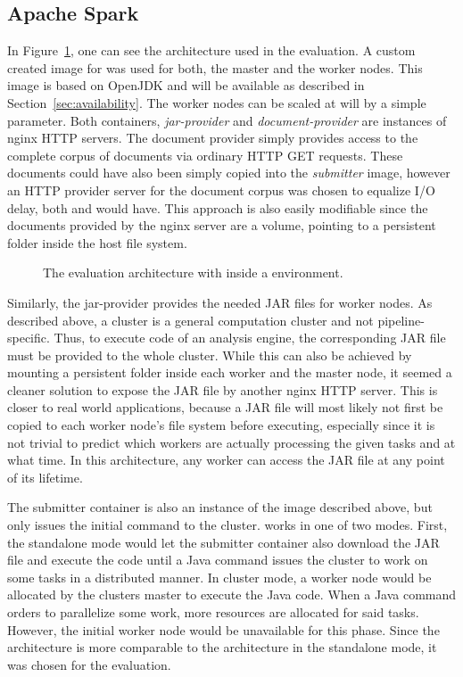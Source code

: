 \subsection{Apache Spark}
\label{ssec:spark}
In Figure~\ref{fig:arch-spark}, one can see the \docker{} architecture used in the evaluation. A custom created image for \spark{} was used for both, the master and the worker nodes. This image is based on OpenJDK and will be available as described in Section~\ref{sec:availability}. The \spark{} worker nodes can be scaled at will by a simple \docker{} parameter. Both containers, \emph{jar-provider} and \emph{document-provider} are  instances of nginx HTTP servers. The document provider simply provides access to the complete corpus of documents via ordinary HTTP GET requests. These documents could have also been simply copied into the \emph{submitter} image, however an HTTP provider server for the document corpus was chosen to equalize I/O delay, both \uimaas{} and \spark{} would have. This approach is also easily modifiable since the documents provided by the nginx server are a volume, pointing to a persistent folder inside the host file system.
\begin{figure}[tbh]
	\centering
	
	\caption[The evaluation architecture with Spark inside a Docker environment.]{The evaluation architecture with \spark{} inside a \docker{} environment.}
	\label{fig:arch-spark}
\end{figure}
Similarly, the jar-provider provides the needed JAR files for \spark{} worker nodes. As described above, a \spark{} cluster is a general computation cluster and not pipeline-specific. Thus, to execute code of an analysis engine, the corresponding JAR file must be provided to the whole cluster. While this can also be achieved by mounting a persistent folder inside each worker and the master node, it seemed a cleaner solution to expose the JAR file by another nginx HTTP server. This is closer to real world applications, because a JAR file will most likely not first be copied to each worker node's file system before executing, especially since it is not trivial to predict which workers are actually processing the given tasks and at what time. In this architecture, any worker can access the JAR file at any point of its lifetime.

The submitter container is also an instance of the \spark{} image described above, but only issues the initial command to the cluster. \spark{} works in one of two modes. First, the standalone mode would let the submitter container also download the JAR file and execute the code until a Java command issues the cluster to work on some tasks in a distributed manner. In cluster mode, a worker node would be allocated by the clusters master to execute the Java code. When a Java command orders \spark{} to parallelize some work, more resources are allocated for said tasks. However, the initial worker node would be unavailable for this phase. Since the architecture is more comparable to the \uimaas{} architecture in the standalone mode, it was chosen for the evaluation.
